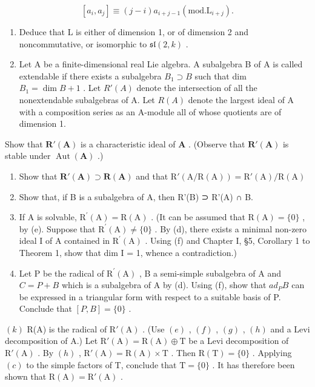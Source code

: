 \[
[ a _ {i}, a _ {j} ] \equiv (j - i) a _ {i + j - 1} (\mathrm{mod}. \mathrm{L} _ {i + j}).
\]

\begin{enumerate}
\def\labelenumi{(\alph{enumi})}
\setcounter{enumi}{2}
\item
  Deduce that L is either of dimension 1, or of dimension 2 and noncommutative, or isomorphic to \(\mathfrak{sl}(2,k)\) .
\item
  Let A be a finite-dimensional real Lie algebra. A subalgebra B of A is called extendable if there exists a subalgebra \(B_{1} \supset B\) such that dim \(B_{1} = \dim B + 1\) . Let \(R'(A)\) denote the intersection of all the nonextendable subalgebras of A. Let \(R(A)\) denote the largest ideal of A with a composition series as an A-module all of whose quotients are of dimension 1.
\end{enumerate}

Show that \(\mathbf{R}'(\mathbf{A})\) is a characteristic ideal of \(\mathbf{A}\) . (Observe that \(\mathbf{R}'(\mathbf{A})\) is stable under \(\operatorname{Aut}(\mathbf{A})\) .)

\begin{enumerate}
\def\labelenumi{(\alph{enumi})}
\setcounter{enumi}{4}
\item
  Show that \(\mathbf{R}'(\mathbf{A})\supset \mathbf{R}(\mathbf{A})\) and that \(\mathrm{R}'(\mathrm{A} / \mathrm{R}(\mathrm{A})) = \mathrm{R}'(\mathrm{A}) / \mathrm{R}(\mathrm{A})\)
\item
  Show that, if B is a subalgebra of A, then R'(B) ⊃ R'(A) ∩ B.
\item
  If A is solvable, \(\mathrm{R}^{\prime}(\mathrm{A}) = \mathrm{R}(\mathrm{A})\) . (It can be assumed that \(\mathrm{R}(\mathrm{A}) = \{0\}\) , by (e). Suppose that \(\mathrm{R}^{\prime}(\mathrm{A}) \neq \{0\}\) . By (d), there exists a minimal non-zero ideal I of A contained in \(\mathrm{R}^{\prime}(\mathrm{A})\) . Using (f) and Chapter I, §5, Corollary 1 to Theorem 1, show that dim I = 1, whence a contradiction.)
\item
  Let P be the radical of \(\mathrm{R}^{\prime}(\mathrm{A})\) , B a semi-simple subalgebra of A and \(C = P + B\) which is a subalgebra of A by (d). Using (f), show that \(ad_{P}B\) can be expressed in a triangular form with respect to a suitable basis of P. Conclude that \([P, B] = \{0\}\) .
\end{enumerate}

\((k)\) R(A) is the radical of \(\mathrm{R}'(\mathrm{A})\) . (Use \((e)\) , \((f)\) , \((g)\) , \((h)\) and a Levi decomposition of A.) Let \(\mathrm{R}'(\mathrm{A}) = \mathrm{R}(\mathrm{A}) \oplus \mathrm{T}\) be a Levi decomposition of \(\mathrm{R}'(\mathrm{A})\) . By \((h)\) , \(\mathrm{R}'(\mathrm{A}) = \mathrm{R}(\mathrm{A}) \times \mathrm{T}\) . Then \(\mathrm{R}(\mathrm{T}) = \{0\}\) . Applying \((c)\) to the simple factors of T, conclude that \(\mathrm{T} = \{0\}\) . It has therefore been shown that \(\mathrm{R}(\mathrm{A}) = \mathrm{R}'(\mathrm{A})\) .


